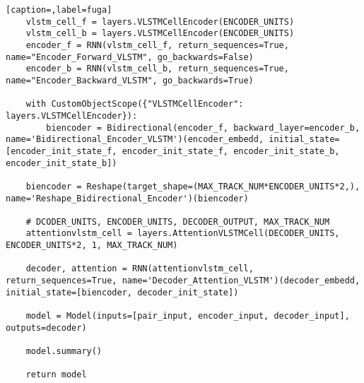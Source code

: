 \begin{lstlisting}[caption=,label=fuga]
    vlstm_cell_f = layers.VLSTMCellEncoder(ENCODER_UNITS)
    vlstm_cell_b = layers.VLSTMCellEncoder(ENCODER_UNITS)
    encoder_f = RNN(vlstm_cell_f, return_sequences=True, name="Encoder_Forward_VLSTM", go_backwards=False)
    encoder_b = RNN(vlstm_cell_b, return_sequences=True, name="Encoder_Backward_VLSTM", go_backwards=True)

    with CustomObjectScope({"VLSTMCellEncoder": layers.VLSTMCellEncoder}):
        biencoder = Bidirectional(encoder_f, backward_layer=encoder_b, name='Bidirectional_Encoder_VLSTM')(encoder_embedd, initial_state=[encoder_init_state_f, encoder_init_state_f, encoder_init_state_b, encoder_init_state_b])

    biencoder = Reshape(target_shape=(MAX_TRACK_NUM*ENCODER_UNITS*2,), name='Reshape_Bidirectional_Encoder')(biencoder)

    # DCODER_UNITS, ENCODER_UNITS, DECODER_OUTPUT, MAX_TRACK_NUM
    attentionvlstm_cell = layers.AttentionVLSTMCell(DECODER_UNITS, ENCODER_UNITS*2, 1, MAX_TRACK_NUM)
    
    decoder, attention = RNN(attentionvlstm_cell, return_sequences=True, name='Decoder_Attention_VLSTM')(decoder_embedd, initial_state=[biencoder, decoder_init_state])
    
    model = Model(inputs=[pair_input, encoder_input, decoder_input], outputs=decoder)

    model.summary()

    return model
\end{lstlisting}

